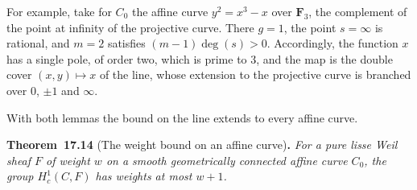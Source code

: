 \documentclass[11pt]{article}
\newenvironment{bpstatement}[2]{\par\addvspace{0.6\baselineskip}\noindent\textbf{#1}#2\textbf{.}\enspace\ignorespaces}
  {\par\addvspace{0.4\baselineskip}}
\newenvironment{bpstatementit}[2]{\begin{bpstatement}{#1}{#2}\itshape\ignorespaces}{\end{bpstatement}}
\begin{document}
\label{bp265}%
For example, take for \(C_0\) the affine curve \(y^2=x^3-x\) over \(\mathbf F_3\), the complement of the point at infinity of the projective curve. There \(g=1\), the point \(s=\infty\) is rational, and \(m=2\) satisfies \((m-1)\deg(s)>0\). Accordingly, the function \(x\) has a single pole, of order two, which is prime to \(3\), and the map is the double cover \((x,y)\mapsto x\) of the line, whose extension to the projective curve is branched over \(0\), \(\pm1\) and \(\infty\).

With both lemmas the bound on the line extends to every affine curve.

\label{bp266}%
\begin{bpstatementit}{Theorem~17.14}{ (The weight bound on an affine curve)}
For a pure lisse Weil sheaf \(F\) of weight \(w\) on a smooth geometrically connected affine curve \(C_0\), the group \(H_c^1(C,F)\) has weights at most \(w+1\).
\end{bpstatementit}
\end{document}

